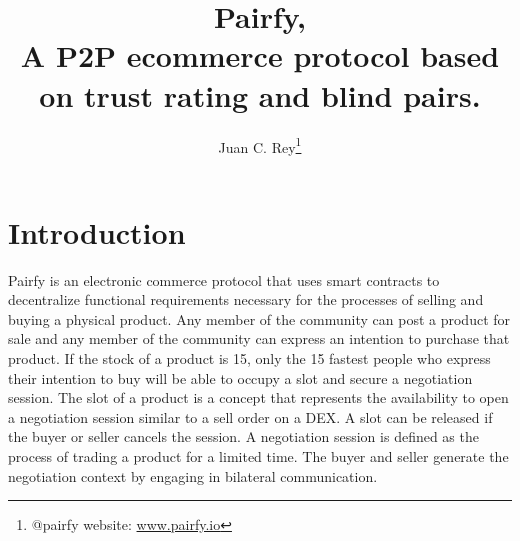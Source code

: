 \documentclass[12pt]{article}
\begin{document}
\title{\textbf{Pairfy,\\A P2P ecommerce protocol based on trust rating and blind pairs. }}
\author{Juan C. Rey\footnote{@pairfy  website: \url{www.pairfy.io} }\\}


\maketitle

\renewcommand*\abstractname{\textbf{}\hfill}


\section{Introduction}

Pairfy is an electronic commerce protocol that uses smart contracts to decentralize functional requirements necessary for the processes of selling and buying a physical product.
Any member of the community can post a product for sale and any member of the community can express an intention to purchase that product.
If the stock of a product is 15, only the 15 fastest people who express their intention to buy will be able to occupy a slot and secure a negotiation session.
The slot of a product is a concept that represents the availability to open a negotiation session similar to a sell order on a DEX. A slot can be released if the buyer or seller cancels the session.
A negotiation session is defined as the process of trading a product for a limited time. The buyer and seller generate the negotiation context by engaging in bilateral communication.
\end{document}
